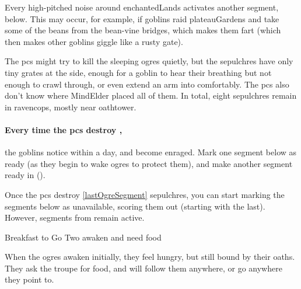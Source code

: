 \begin{multicols}{2}
\label{wakingOgres}

\noindent
Every high-pitched noise around \gls{enchantedLands} activates another \gls{segment}, below.
This may occur, for example, if goblins raid \gls{plateauGardens} and take some of the beans from the bean-vine bridges, which makes them fart (which then makes other goblins giggle like a rusty gate).

The \glspl{pc} might try to kill the sleeping \glspl{ogre} quietly, but the \glspl{sepulchre} have only tiny grates at the side, enough for a goblin to hear their breathing but not enough to crawl through, or even extend an arm into comfortably.
The \glspl{pc} also don't know where \gls{MindElder} placed all of them.
In total, eight \glspl{sepulchre} remain in \gls{ravencops}, mostly near \gls{oathtower}.

\paragraph{Every time the \glspl{pc} destroy ,}
the goblins notice within a day, and become enraged.
Mark one \gls{segment} below as ready (as they begin to wake \glspl{ogre} to protect them), and make another \gls{segment} ready in  ().

Once the \glspl{pc} destroy \ref{lastOgreSegment} \glspl{sepulchre}, you can start marking the \glspl{segment} below as unavailable, scoring them out (starting with the last).
However, \glspl{segment} from  remain active.

\setcounter{segNo}{-1}
{Breakfast to Go}%
{Two  awaken and need food}%

When the \glspl{ogre} awaken initially, they feel hungry, but still bound by their oaths.
They ask the troupe for food, and will follow them anywhere, or go anywhere they point to.




\end{multicols}
